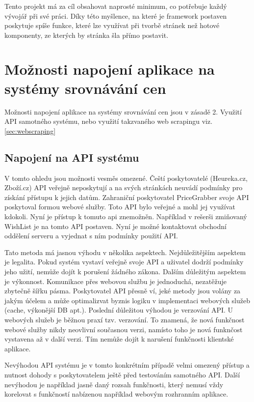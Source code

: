 Tento projekt má za cíl obsahovat naprosté minimum, co potřebuje každý vývojář při své práci\cite{website:boilerplate-history}. Díky této myšlence, na které je framework postaven poskytuje spíše funkce, které lze využívat při tvorbě stránek než hotové komponenty, ze kterých by stránka šla přímo postavit.

\section{Možnosti napojení aplikace na systémy srovnávání cen}
Možnosti napojení aplikace na systémy srovnávání cen jsou v zásadě 2. Využití API samotného systému, nebo využití takzvaného web scrapingu viz. \ref{sec:webscraping}

\subsection{Napojení na API systému}
V tomto ohledu jsou možnosti vesměs omezené. Čeští poskytovatelé (Heureka.cz, Zboží.cz) API veřejně neposkytují a na svých stránkách neuvádí podmínky pro získání přístupu k jejich datům. Zahraniční poskytovatel PriceGrabber svoje API poskytoval formou webové služby. Toto API bylo veřejné a mohl jej využívat kdokoli. Nyní je přístup k tomuto api znemožněn\cite{website:pricegrabber-api}. Například v rešerši zmiňovaný WishList je na tomto API postaven. Nyní je možné kontaktovat obchodní oddělení serveru a vyjednat s ním podmínky použití API.

Tato metoda má jasnou výhodu v několika aspektech. Nejdůležitějším aspektem je legalita. Pokud systém vystaví veřejně svoje API a uživatel dodrží podmínky jeho užití, nemůže dojít k porušení žádného zákona. Dalším důležitým aspektem je výkonnost. Komunikace přes webovou službu je jednoduchá, nezatěžuje zbytečně šířku pásma. Poskytovatel API přesně ví, jeké metody jsou volány za jakým účelem a může optimalizvat byznis logiku v implementaci webových služeb (cache, výkonější DB apt.). Poslední důležitou výhodou je verzování API. U webových služeb je běžnou praxí tzv. verzování\cite{josuttis2007soa}. To znamená, že nová funkčnost webové služby nikdy neovlivní současnou verzi, namísto toho je nová funknčost vystavena až v další verzi. Tím nemůže dojít k narušení funkčnosti klientské aplikace.

Nevýhodou API systému je v tomto konkrétním případě velmi omezený přístup a nutnost dohody s poskytovatelem ještě před testováním samotného API. Další nevýhodou je například jasně daný rozsah funkčnosti, který nemusí vždy korelovat s funkčností nabízenou například webovým rozhranním aplikace.


